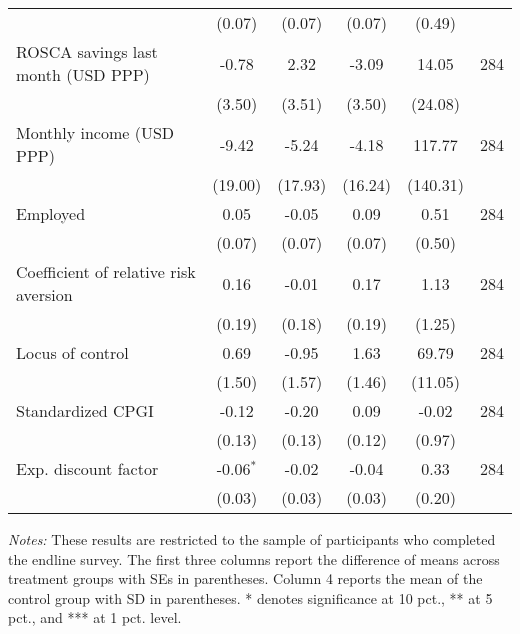 \begin{table}[h]
{\begin{threeparttable}
\begin{tabular}{l*{5}{c}}
          &   (0.07)&   (0.07)&   (0.07)&   (0.49)&         \\
ROSCA savings last month (USD PPP)&    -0.78&     2.32&    -3.09&    14.05&      284\\
          &   (3.50)&   (3.51)&   (3.50)&  (24.08)&         \\
Monthly income (USD PPP)&    -9.42&    -5.24&    -4.18&   117.77&      284\\
          &  (19.00)&  (17.93)&  (16.24)& (140.31)&         \\
Employed  &     0.05&    -0.05&     0.09&     0.51&      284\\
          &   (0.07)&   (0.07)&   (0.07)&   (0.50)&         \\
Coefficient of relative risk aversion&     0.16&    -0.01&     0.17&     1.13&      284\\
          &   (0.19)&   (0.18)&   (0.19)&   (1.25)&         \\
Locus of control&     0.69&    -0.95&     1.63&    69.79&      284\\
          &   (1.50)&   (1.57)&   (1.46)&  (11.05)&         \\
Standardized CPGI&    -0.12&    -0.20&     0.09&    -0.02&      284\\
          &   (0.13)&   (0.13)&   (0.12)&   (0.97)&         \\
Exp. discount factor&-0.06$^{*}$&    -0.02&    -0.04&     0.33&      284\\
          &   (0.03)&   (0.03)&   (0.03)&   (0.20)&         \\
\bottomrule \end{tabular} \begin{tablenotes}[flushleft] \footnotesize \item \emph{Notes:} These results are restricted to the sample of participants who completed the endline survey. The first three columns report the difference of means across treatment groups with SEs in parentheses. Column 4 reports the mean of the control group with SD in parentheses. * denotes significance at 10 pct., ** at 5 pct., and *** at 1 pct. level. \end{tablenotes} \end{threeparttable} } \end{table}


